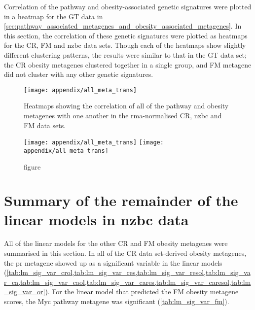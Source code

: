 	Correlation of the pathway and obesity-associated genetic signatures were plotted in a heatmap for the GT data in \cref{sec:pathway_associated_metagenes_and_obesity_associated_metagenes}.
	In this section, the correlation of these genetic signatures were plotted as heatmaps for the CR, FM and \gls{nzbc} data sets.
	Though each of the heatmaps show slightly different clustering patterns, the results were similar to that in the GT data set; the CR obesity metagenes clustered together in a single group, and FM metagene did not cluster with any other genetic signatures.

	\begin{figure}[htp!]
		\centering
		\texttt{[image: appendix/all\_meta\_trans]}
		\caption[Heatmaps of the Pearson correlation of all the obesity and the pathway metagenes with one another in the \gls{rma}-normalised CR, \gls{nzbc} and FM data]{Heatmaps showing the correlation of all of the pathway and obesity metagenes with one another in the \gls{rma}-normalised CR, \gls{nzbc} and FM data sets.
		}
		\label{fig:appendix/all_meta_other_data}
	\end{figure}

	\begin{figure}[htpb]
		\ContinuedFloat
		\captionsetup{list=off,format=cont}
		\centering
		\texttt{[image: appendix/all\_meta\_trans]}
		\texttt{[image: appendix/all\_meta\_trans]}
		\caption[]{figure}
	\end{figure}

	\newpage

	\section{Summary of the remainder of the linear models in \gls{nzbc} data}
	\label{sec:summary_of_the_linear_models_in_nzbc_data}

	All of the linear models for the other CR and FM obesity metagenes were summarised in this section.
	In all of the CR data set-derived obesity metagenes, the \gls{pr} metagene showed up as a significant variable in the linear models (\cref{tab:lm_sig_var_crol,tab:lm_sig_var_res,tab:lm_sig_var_resol,tab:lm_sig_var_ca,tab:lm_sig_var_caol,tab:lm_sig_var_cares,tab:lm_sig_var_caresol,tab:lm_sig_var_or}).
	For the linear model that predicted the FM obesity metagene scores, the Myc pathway metagene was significant (\cref{tab:lm_sig_var_fm}).

